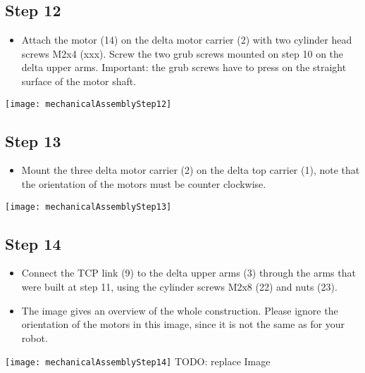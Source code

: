 \subsection*{Step 12}

\begin{minipage}[t]{0.6\textwidth}
	\begin{itemize}
		\item Attach the motor (14) on the delta motor carrier (2) with two cylinder head screws M2x4 (xxx). Screw the two grub screws mounted on step 10 on the delta upper arms. Important: the grub screws have to press on the straight surface of the motor shaft.
	\end{itemize}
\end{minipage}
\hfill
\begin{minipage}[t]{0.35\textwidth}
	\vspace{-\ht\strutbox}\texttt{[image: mechanicalAssemblyStep12]}
	\label{fig:MechanicalAssebmlyStep12} 
\end{minipage}

\subsection*{Step 13}

\begin{minipage}[t]{0.6\textwidth}
	\begin{itemize}
		\item Mount the three delta motor carrier (2) on the delta top carrier (1), note that the orientation of the motors must be counter clockwise.
	\end{itemize}
\end{minipage}
\hfill
\begin{minipage}[t]{0.35\textwidth}
	\vspace{-\ht\strutbox}\texttt{[image: mechanicalAssemblyStep13]}
	\label{fig:MechanicalAssebmlyStep13} 
\end{minipage}

\subsection*{Step 14}

\begin{minipage}[t]{0.6\textwidth}
	\begin{itemize}
		\item Connect the TCP link (9) to the delta upper arms (3) through the arms that were built at step 11, using the cylinder screws M2x8 (22) and nuts (23).
		\item The image gives an overview of the whole construction. Please ignore the orientation of the motors in this image, since it is not the same as for your robot.
	\end{itemize}
\end{minipage}
\hfill
\begin{minipage}[t]{0.35\textwidth}
	\vspace{-\ht\strutbox}\texttt{[image: mechanicalAssemblyStep14]}
	TODO: replace Image
	\label{fig:MechanicalAssebmlyStep14} 
\end{minipage}


